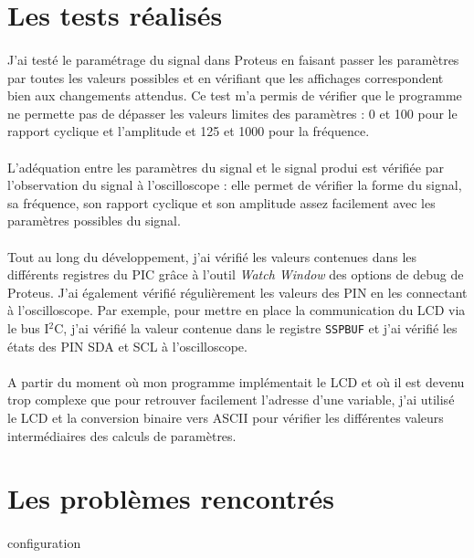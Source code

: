 \documentclass{article}
\begin{document}
    \section{Les tests réalisés}
    \paragraph{}
    J'ai testé le paramétrage du signal dans Proteus en faisant passer les paramètres par toutes les valeurs possibles et en vérifiant que les affichages correspondent bien aux changements attendus. Ce test m'a permis de vérifier que le programme ne permette pas de dépasser les valeurs limites des paramètres : 0 et 100 pour le rapport cyclique et l'amplitude et 125 et 1000 pour la fréquence.

    \paragraph{}
    L'adéquation entre les paramètres du signal et le signal produi est vérifiée par l'observation du signal à l'oscilloscope : elle permet de vérifier la forme du signal, sa fréquence, son rapport cyclique et son amplitude assez facilement avec les paramètres possibles du signal.

    \paragraph{}
    Tout au long du développement, j'ai vérifié les valeurs contenues dans les différents registres du PIC grâce à l'outil \emph{Watch Window} des options de debug de Proteus. J'ai également vérifié régulièrement les valeurs des PIN en les connectant à l'oscilloscope. Par exemple, pour mettre en place la communication du LCD via le bus I$^2$C, j'ai vérifié la valeur contenue dans le registre \texttt{SSPBUF} et j'ai vérifié les états des PIN SDA et SCL à l'oscilloscope.

    \paragraph{}
    A partir du moment où mon programme implémentait le LCD et où il est devenu trop complexe que pour retrouver facilement l'adresse d'une variable, j'ai utilisé le LCD et la conversion binaire vers ASCII pour vérifier les différentes valeurs intermédiaires des calculs de paramètres.



    \section{Les problèmes rencontrés}
    \paragraph{}

    configuration 
    
\end{document}
